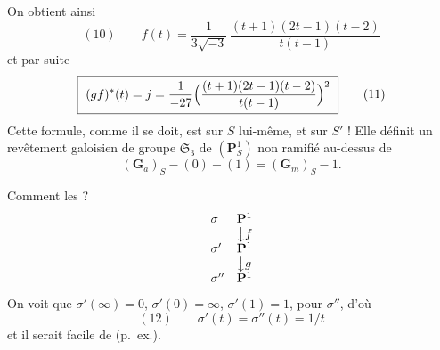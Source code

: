\documentclass[11pt,a4paper]{article}
\begin{document}
On obtient ainsi
\[
(10)\qquad f(t) = \frac{1}{3\sqrt{-3}}\,\frac{(t+1)(2t-1)(t-2)}{t(t-1)}
\]
et par suite
\[
\boxed{\ (g f)^*(t) = j = \frac{1}{-27}\Bigl(\frac{(t+1)(2t-1)(t-2)}{t(t-1)}\Bigr)^2\ }
\qquad (11)
\]
Cette formule, comme il se doit, est  %
sur $S$ lui-même, et  sur $S'$ ! Elle définit un revêtement galoisien de groupe
$\mathfrak{S}_3$ de \struck{\ill{}} $(\mathbf{P}^1_S)$   \ill{} non ramifié au-dessus de
\[
(\mathbf{G}_a)_S - (0) - (1) = (\mathbf{G}_m)_S - 1 .
\]

Comment  les  ?
\[
\begin{array}{ll}
\sigma & \mathbf{P}^1\\
& \big\downarrow f\\
\sigma' & \mathbf{P}^1\\
& \big\downarrow g\\
\sigma'' & \mathbf{P}^1
\end{array}
\]
On voit que $\sigma'(\infty)=0$, $\sigma'(0)=\infty$, $\sigma'(1)=1$,
 \ill{}  pour $\sigma''$, d'où 
\[
(12)\qquad \sigma'(t) = \sigma''(t) = 1/t
\]
et il serait facile de  \ill{}  \ill{} \ill{}  (p.\ ex.).
\end{document}
